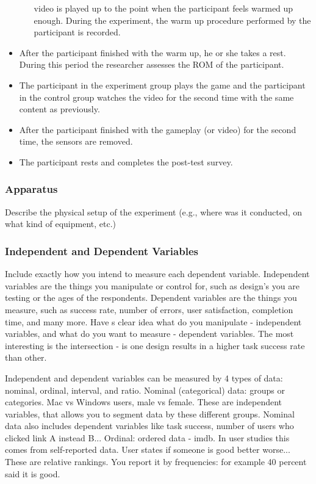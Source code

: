 \begin{itemize}
\begin{itemize}
video is played up to the point when the participant feels warmed up enough. During the experiment, the warm up procedure performed by the participant is recorded.
\end{itemize}
\item After the participant finished with the warm up, he or she takes a rest. During this period the researcher assesses the ROM of the participant. 
\item The participant in the experiment group plays the game and the participant in the control group watches the video for the second time with the same content as previously.%
\item After the participant finished with the gameplay (or video) for the second time, the sensors are removed.
\item The participant rests and completes the post-test survey. 
\end{itemize}
\subsubsection{Apparatus}
Describe the physical setup of the experiment (e.g., where was it conducted, on what kind of equipment, etc.)
\subsubsection{Independent and Dependent Variables}
Include exactly how you intend to measure each dependent variable. 
Independent variables are the things you manipulate or control for, such as design's you are testing or the ages of the respondents. 
Dependent variables are the things you measure, such as success rate, number of errors, user satisfaction, completion time, and many more. Have s clear idea what do you manipulate - independent variables, and what do you want to measure - dependent variables. The most interesting is the intersection - is one design results in a higher task success rate than other. 

Independent and dependent variables can be measured by 4 types of data: nominal, ordinal, interval, and ratio. 
Nominal (categorical) data: groups or categories. Mac vs Windows users, male vs female. These are independent variables, that allows you to segment data by these different groups. Nominal data also includes dependent variables like task success, number of users who clicked link A instead B... 
Ordinal: ordered data - imdb. In user studies this comes from self-reported data. User states if someone is good better worse... These are relative rankings. You report it by frequencies: for example 40 percent said it is good. 

